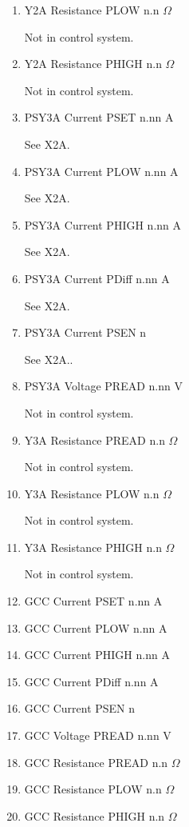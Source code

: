 \documentclass[11pt]{book}		%
\begin{document}
\begin{enumerate}
 \item Y2A Resistance PLOW n.n $\Omega$

\color{red}
Not in control system.
\color{black}

 \item Y2A Resistance PHIGH n.n $\Omega$

\color{red}
Not in control system.
\color{black}

 \item PSY3A Current PSET  n.nn A

\color{red}
See X2A.
\color{black}

 \item PSY3A Current PLOW  n.nn A

\color{red}
See X2A.
\color{black}

 \item PSY3A Current PHIGH n.nn A

\color{red}
See X2A.
\color{black}

 \item PSY3A Current PDiff n.nn A

\color{red}
See X2A.
\color{black}

 \item PSY3A Current PSEN  n

\color{red}
See X2A..
\color{black}

 \item PSY3A Voltage PREAD n.nn V

\color{red}
Not in control system.
\color{black}

 \item Y3A Resistance PREAD n.n $\Omega$

\color{red}
Not in control system.
\color{black}

 \item Y3A Resistance PLOW n.n $\Omega$

\color{red}
Not in control system.
\color{black}

 \item Y3A Resistance PHIGH n.n $\Omega$

\color{red}
Not in control system.
\color{black}

 \item GCC Current PSET  n.nn A
 \item GCC Current PLOW  n.nn A
 \item GCC Current PHIGH n.nn A
 \item GCC Current PDiff n.nn A
 \item GCC Current PSEN  n
 \item GCC Voltage PREAD n.nn V
 \item GCC Resistance PREAD n.n $\Omega$
 \item GCC Resistance PLOW n.n $\Omega$
 \item GCC Resistance PHIGH n.n $\Omega$
\end{enumerate}
\end{document}
